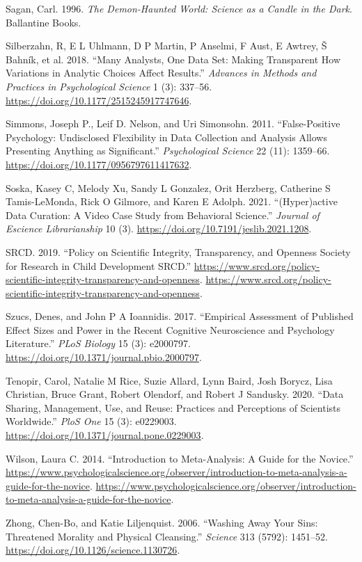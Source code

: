 \documentclass[
  letterpaper,
  DIV=11,
  numbers=noendperiod]{scrartcl}
\newlength{\cslhangindent}
\newenvironment{CSLReferences}[2] %
 {\begin{list}{}{%
  \setlength{\itemindent}{0pt}
  \setlength{\leftmargin}{0pt}
  \setlength{\parsep}{0pt}
  \ifodd #1
   \setlength{\leftmargin}{\cslhangindent}
   \setlength{\itemindent}{-1\cslhangindent}
  \fi
  \setlength{\itemsep}{#2\baselineskip}}}
 {\end{list}}
\begin{document}
\begin{CSLReferences}{1}{0}
Sagan, Carl. 1996. \emph{The {D}emon-Haunted {W}orld: {S}cience as a
{C}andle in the {D}ark}. Ballantine Books.

Silberzahn, R, E L Uhlmann, D P Martin, P Anselmi, F Aust, E Awtrey, Š
Bahník, et al. 2018. {``Many Analysts, One Data Set: Making Transparent
How Variations in Analytic Choices Affect Results.''} \emph{Advances in
Methods and Practices in Psychological Science} 1 (3): 337--56.
\url{https://doi.org/10.1177/2515245917747646}.

Simmons, Joseph P., Leif D. Nelson, and Uri Simonsohn. 2011.
{``False-Positive Psychology: {U}ndisclosed Flexibility in Data
Collection and Analysis Allows Presenting Anything as Significant.''}
\emph{Psychological Science} 22 (11): 1359--66.
\url{https://doi.org/10.1177/0956797611417632}.

Soska, Kasey C, Melody Xu, Sandy L Gonzalez, Orit Herzberg, Catherine S
Tamis-LeMonda, Rick O Gilmore, and Karen E Adolph. 2021.
{``(Hyper)active Data Curation: A Video Case Study from Behavioral
Science.''} \emph{Journal of Escience Librarianship} 10 (3).
\url{https://doi.org/10.7191/jeslib.2021.1208}.

SRCD. 2019. {``Policy on Scientific Integrity, Transparency, and
Openness \textbar{} Society for Research in Child Development {SRCD}.''}
\url{https://www.srcd.org/policy-scientific-integrity-transparency-and-openness}.
\url{https://www.srcd.org/policy-scientific-integrity-transparency-and-openness}.

Szucs, Denes, and John P A Ioannidis. 2017. {``Empirical Assessment of
Published Effect Sizes and Power in the Recent Cognitive Neuroscience
and Psychology Literature.''} \emph{PLoS Biology} 15 (3): e2000797.
\url{https://doi.org/10.1371/journal.pbio.2000797}.

Tenopir, Carol, Natalie M Rice, Suzie Allard, Lynn Baird, Josh Borycz,
Lisa Christian, Bruce Grant, Robert Olendorf, and Robert J Sandusky.
2020. {``Data Sharing, Management, Use, and Reuse: Practices and
Perceptions of Scientists Worldwide.''} \emph{PloS One} 15 (3):
e0229003. \url{https://doi.org/10.1371/journal.pone.0229003}.

Wilson, Laura C. 2014. {``Introduction to {Meta-Analysis}: A Guide for
the Novice.''}
\url{https://www.psychologicalscience.org/observer/introduction-to-meta-analysis-a-guide-for-the-novice}.
\url{https://www.psychologicalscience.org/observer/introduction-to-meta-analysis-a-guide-for-the-novice}.

Zhong, Chen-Bo, and Katie Liljenquist. 2006. {``Washing Away Your Sins:
{T}hreatened Morality and Physical Cleansing.''} \emph{Science} 313
(5792): 1451--52. \url{https://doi.org/10.1126/science.1130726}.

\end{CSLReferences}
\end{document}
